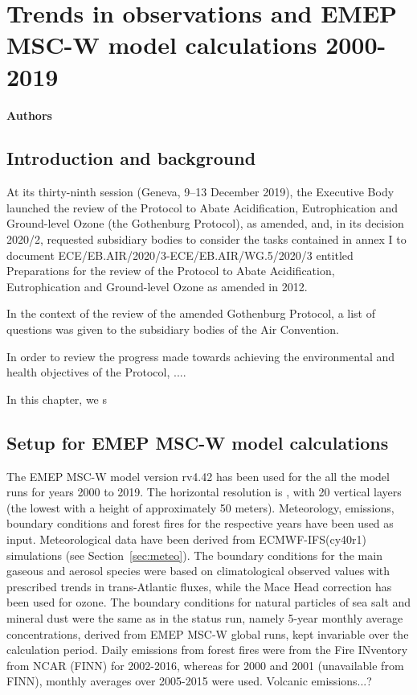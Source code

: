 \chapter[Trends]{Trends in observations and EMEP MSC-W model calculations 2000-2019}
\label{ch:Trends}

{\bf{Authors}}\\


\section{\label{sec:Trends_introduction}Introduction and background}
At its thirty-ninth session (Geneva, 9–13 December 2019), the Executive Body launched the review of the Protocol to Abate Acidification, Eutrophication and Ground-level Ozone (the Gothenburg Protocol), as amended, and, in its decision 2020/2, requested subsidiary bodies to consider the tasks contained in annex I to document ECE/EB.AIR/2020/3-ECE/EB.AIR/WG.5/2020/3 entitled Preparations for the review of the Protocol to Abate Acidification, Eutrophication and Ground-level Ozone as amended in 2012.

In the context of the review of the amended Gothenburg Protocol, a list of questions was given to the subsidiary bodies of the Air Convention.

In order to review the progress made towards achieving the environmental and health objectives of the Protocol, ....

In this chapter, we s


\section{\label{EMEPmodelcalc}{Setup for EMEP MSC-W model calculations}}
The EMEP MSC-W model version rv4.42 has been used for the all the model runs for years 2000 to 2019. The horizontal resolution is \resZO, with 20 vertical layers (the lowest with a height of approximately 50 meters).
 Meteorology, emissions, boundary conditions and forest fires for the respective years have been used as input. Meteorological data have been
 derived from ECMWF-IFS(cy40r1) simulations (see Section~\ref{sec:meteo}). 
 The boundary conditions for the main gaseous and aerosol species were based on climatological observed values with prescribed trends in trans-Atlantic fluxes, while the Mace
Head correction has been used for ozone. The boundary conditions for natural particles of
sea salt and mineral dust were the same as in the status run, namely 5-year monthly average
concentrations, derived from EMEP MSC-W global runs, kept invariable over the calculation
period.
Daily emissions from forest fires were from the Fire INventory from NCAR (FINN) for 2002-2016,
whereas for 2000 and 2001 (unavailable from FINN), monthly averages over 2005-2015 were
used.
 Volcanic emissions...?
 
